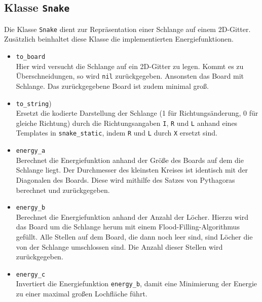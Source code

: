 \documentclass[parskip=half,paper=a4]{scrartcl}
\begin{document}
  \subsection{Klasse \lstinline-Snake-}
    Die Klasse \lstinline-Snake- dient zur Repräsentation einer Schlange auf einem
    2D-Gitter. Zusätzlich beinhaltet diese Klasse die implementierten
    Energiefunktionen.
    \begin{itemize}
      \item \lstinline-to_board-\\
        Hier wird versucht die Schlange auf ein 2D-Gitter zu legen. Kommt es zu
        Überschneidungen, so wird \lstinline-nil- zurückgegeben. Ansonsten das Board
        mit Schlange. Das zurückgegebene Board ist zudem minimal groß.
      \item \lstinline-to_string-) \\
        Ersetzt die kodierte Darstellung der Schlange (1 für Richtungsänderung,
        0 für gleiche Richtung) durch die Richtungsangaben \texttt{I}, \texttt{R}
        und \texttt{L} anhand eines Templates in \lstinline-snake_static-, indem
        \texttt{R} und \texttt{L} durch \texttt{X} ersetzt sind.
      \item \lstinline-energy_a- \\
        Berechnet die Energiefunktion anhand der Größe des Boards auf dem die
        Schlange liegt. Der Durchmesser des kleinsten Kreises ist identisch mit der
        Diagonalen des Boards. Diese wird mithilfe des Satzes von Pythagoras
        berechnet und zurückgegeben.
      \item \lstinline-energy_b- \\
        Berechnet die Energiefunktion anhand der Anzahl der Löcher. Hierzu wird
        das Board um die Schlange herum mit einem Flood-Filling-Algorithmus gefüllt.
        Alle Stellen auf dem Board, die dann noch leer sind, sind Löcher die von
        der Schlange umschlossen sind. Die Anzahl dieser Stellen wird
        zurückgegeben.
      \item \lstinline-energy_c- \\
        Invertiert die Energiefunktion \lstinline-energy_b-, damit eine
        Minimierung der Energie zu einer maximal großen Lochfläche führt.
    \end{itemize}
  
\end{document}
